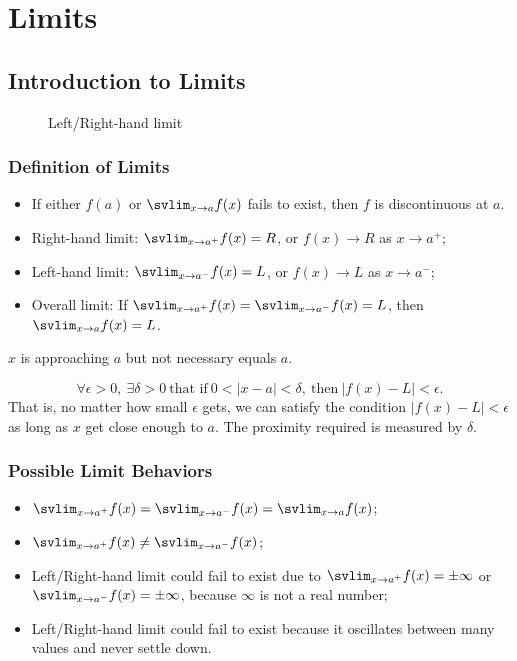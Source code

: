 \chapter{Limits}
\section{Introduction to Limits}
\begin{figure}[H]
  \centering
  \caption{Left/Right-hand limit}
\end{figure}

\subsection{Definition of Limits}
\begin{itemize}
\item If either $f(a)$ or $\svlim_{x\to a} f(x)$ fails to exist, then $f$ is discontinuous at $a$.
\item Right-hand limit: $\svlim_{x\to a^+}f(x)=R$, or $f(x)\to R$ as $x\to a^+$;
\item Left-hand limit: $\svlim_{x\to a^-}f(x)=L$, or $f(x)\to L$ as $x\to a^-$;
\item Overall limit: If $\svlim_{x\to a^+}f(x)=\svlim_{x\to a^-}f(x)=L$, then $\svlim_{x\to a}f(x)=L$.
\end{itemize}

\begin{note} $x$ is approaching $a$ but not necessary equals $a$.\end{note}
\begin{definition}
\[
\forall\epsilon>0,\ \exists\delta>0\ \text{that if}\ 0<\lvert x-a\rvert<\delta,\ \text{then}\ \lvert f(x)-L\rvert<\epsilon.
\]
That is, no matter how small $\epsilon$ gets, we can satisfy the condition $\lvert f(x)-L\rvert<\epsilon$ as long as $x$ get close enough to $a$. The proximity required is measured by $\delta$.
\end{definition}

\subsection{Possible Limit Behaviors}
\begin{itemize}
\item $\svlim_{x\to a^+}f(x)=\svlim_{x\to a^-}f(x)=\svlim_{x\to a}f(x)$;
\item $\svlim_{x\to a^+}f(x)\neq\svlim_{x\to a^-}f(x)$;
\item Left\slash Right-hand limit could fail to exist due to $\svlim_{x\to a^+}f(x)=\pm\infty$ or $\svlim_{x\to a^-}f(x)=\pm\infty$, because $\infty$ is not a real number;
\item Left\slash Right-hand limit could fail to exist because it oscillates between many values and never settle down.
\end{itemize}

